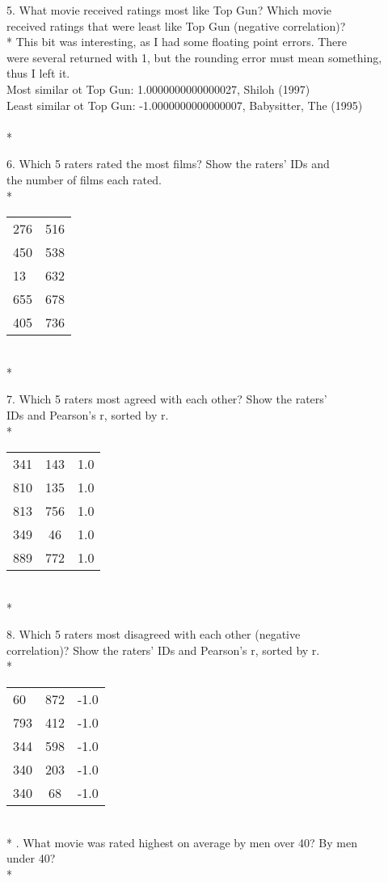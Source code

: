 \documentclass{article}
\begin{document}
5.  What movie received ratings most like Top Gun? Which movie\\
received ratings that were least like Top Gun (negative correlation)?\\*
This bit was interesting, as I had some floating point errors. There\\
were several returned with 1, but the rounding error must mean something,\\
thus I left it.\\
Most similar ot Top Gun: 1.0000000000000027, Shiloh (1997)\\
Least similar ot Top Gun: -1.0000000000000007, Babysitter, The (1995)\\
\\*

6.  Which 5 raters rated the most films? Show the raters' IDs and\\
the number of films each rated.\\*
\begin{tabular}{ l r }
276 & 516 \\
450 & 538 \\
13 & 632 \\
655 & 678 \\
405 & 736 \\
\end{tabular}
\\*

7.  Which 5 raters most agreed with each other? Show the raters'\\
IDs and Pearson's r, sorted by r.\\*
\begin{tabular}{ l c r }
341  & 143  & 1.0 \\
810  & 135  & 1.0 \\
813  & 756  & 1.0 \\
349  & 46  & 1.0 \\
889  & 772  & 1.0 \\
\end{tabular}
\\*

8.  Which 5 raters most disagreed with each other (negative\\
correlation)? Show the raters' IDs and Pearson's r, sorted by r.\\*
\begin{tabular}{ l c r }
60 & 872 & -1.0 \\
793 & 412 & -1.0 \\
344 & 598 & -1.0 \\
340 & 203 & -1.0 \\
340 & 68 & -1.0 \\
\end{tabular}
\\*
.  What movie was rated highest on average by men over 40? By men\\
under 40?\\*
\end{document}
